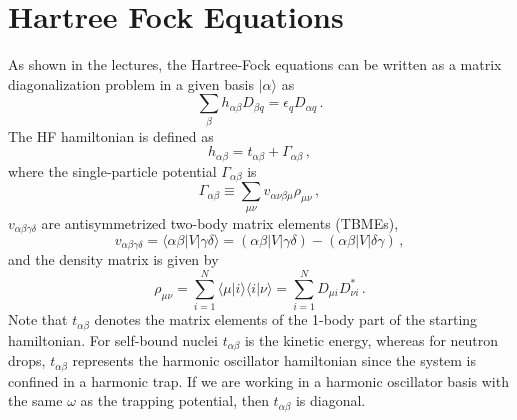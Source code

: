 \documentclass[letterpaper,12pt]{article}
\begin{document}

\section{Hartree Fock Equations}

As shown in the lectures, the Hartree-Fock equations can be written as a matrix diagonalization problem in a given basis $|\alpha\rangle$ as
\begin{equation}
\sum_{\beta}h_{\alpha\beta} D_{\beta q} = \epsilon_q D_{\alpha q}\,.  
\end{equation}
The  HF hamiltonian is defined as
\begin{equation}
h_{\alpha\beta} = t_{\alpha\beta} + \Gamma_{\alpha\beta}\,,
\end{equation} 
where the single-particle potential $\Gamma_{\alpha\beta}$ is  
\begin{equation}
\Gamma_{\alpha\beta}\equiv \sum_{\mu\nu}v_{\alpha\nu\beta\mu}\rho_{\mu\nu}\,,
\end{equation}
$v_{\alpha\beta\gamma\delta}$ are antisymmetrized two-body matrix elements (TBMEs), 
\begin{equation}
v_{\alpha\beta\gamma\delta} = \langle\alpha\beta|V|\gamma\delta\rangle = (\alpha\beta|V|\gamma\delta) - (\alpha\beta|V|\delta\gamma)\,,
\end{equation}
and the density matrix is given by
\begin{equation}
\rho_{\mu\nu}=\sum_{i=1}^{N}\langle\mu|i\rangle\langle i|\nu\rangle = \sum_{i=1}^{N}D_{\mu i}D^*_{\nu i}\,.
\end{equation}
Note that $t_{\alpha\beta}$ denotes the matrix elements of the 1-body part of the starting hamiltonian. For self-bound nuclei $t_{\alpha\beta}$ is the kinetic energy, whereas for neutron drops, $t_{\alpha\beta}$ represents the harmonic oscillator hamiltonian since the system is confined in a harmonic trap. If we are working in a harmonic oscillator basis with the same $\omega$ as the trapping potential, then $t_{\alpha\beta}$ is diagonal. 
\end{document}
